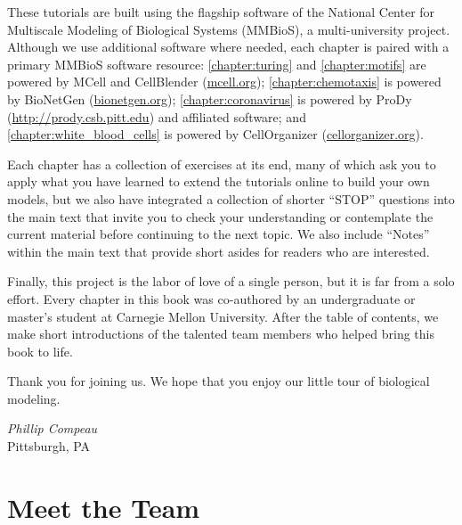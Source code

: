 These tutorials are built using the flagship software of the National Center for Multiscale Modeling of Biological Systems (MMBioS), a multi-university project. Although we use additional software where needed, each chapter is paired with a primary MMBioS software resource: \autoref{chapter:turing} and \autoref{chapter:motifs} are powered by MCell and CellBlender (\url{mcell.org}); \autoref{chapter:chemotaxis} is powered by BioNetGen (\url{bionetgen.org}); \autoref{chapter:coronavirus} is powered by ProDy (\url{http://prody.csb.pitt.edu}) and affiliated software; and \autoref{chapter:white_blood_cells} is powered by CellOrganizer (\url{cellorganizer.org}).

Each chapter has a collection of exercises at its end, many of which ask you to apply what you have learned to extend the tutorials online to build your own models, but we also have integrated a collection of shorter ``STOP'' questions into the main text that invite you to check your understanding or contemplate the current material before continuing to the next topic. We also include ``Notes'' within the main text that provide short asides for readers who are interested.

Finally, this project is the labor of love of a single person, but it is far from a solo effort. Every chapter in this book was co-authored by an undergraduate or master's student at Carnegie Mellon University. After the table of contents, we make short introductions of the talented team members who helped bring this book to life.

Thank you for joining us. We hope that you enjoy our little tour of biological modeling.

\begin{flushright}
\textit{Phillip Compeau}\\
{Pittsburgh, PA}
\end{flushright}

\phantom{}\vspace{7.7\baselineskip}

\newpage

\tableofcontents*
\clearpage
{}


\newpage
{}
\chapter{Meet the Team}

